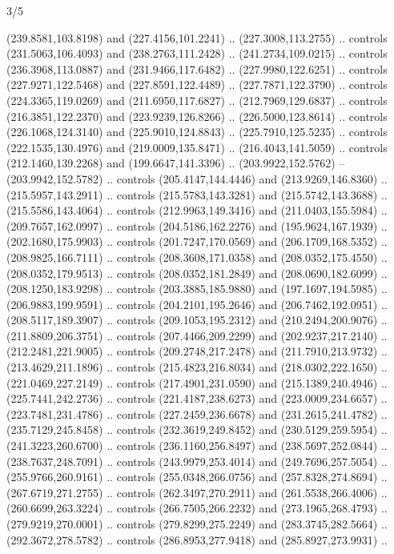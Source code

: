 \begin{flagdescription}{3/5}
\begin{scope}[shift={(0.5\flaglength,0.5\flagwidth)},scale=\flagwidth/510]
\begin{scope}[y=0.80pt, x=0.80pt, yscale=-1.06, xscale=1.06,yshift=-240pt,xshift=-400pt]
\begin{scope}[cm={{0.83333,0.0,0.0,0.83333,(154.64672,48.64761)}}]
  (239.8581,103.8198) and (227.4156,101.2241) .. (227.3008,113.2755) .. controls
  (231.5063,106.4093) and (238.2763,111.2428) .. (241.2734,109.0215) .. controls
  (236.3968,113.0887) and (231.9466,117.6482) .. (227.9980,122.6251) .. controls
  (227.9271,122.5468) and (227.8591,122.4489) .. (227.7871,122.3790) .. controls
  (224.3365,119.0269) and (211.6950,117.6827) .. (212.7969,129.6837) .. controls
  (216.3851,122.2370) and (223.9239,126.8266) .. (226.5000,123.8614) .. controls
  (226.1068,124.3140) and (225.9010,124.8843) .. (225.7910,125.5235) .. controls
  (222.1535,130.4976) and (219.0009,135.8471) .. (216.4043,141.5059) .. controls
  (212.1460,139.2268) and (199.6647,141.3396) .. (203.9922,152.5762) --
  (203.9942,152.5782) .. controls (205.4147,144.4446) and (213.9269,146.8360) ..
  (215.5957,143.2911) .. controls (215.5783,143.3281) and (215.5742,143.3688) ..
  (215.5586,143.4064) .. controls (212.9963,149.3416) and (211.0403,155.5984) ..
  (209.7657,162.0997) .. controls (204.5186,162.2276) and (195.9624,167.1939) ..
  (202.1680,175.9903) .. controls (201.7247,170.0569) and (206.1709,168.5352) ..
  (208.9825,166.7111) .. controls (208.3608,171.0358) and (208.0352,175.4550) ..
  (208.0352,179.9513) .. controls (208.0352,181.2849) and (208.0690,182.6099) ..
  (208.1250,183.9298) .. controls (203.3885,185.9880) and (197.1697,194.5985) ..
  (206.9883,199.9591) .. controls (204.2101,195.2646) and (206.7462,192.0951) ..
  (208.5117,189.3907) .. controls (209.1053,195.2312) and (210.2494,200.9076) ..
  (211.8809,206.3751) .. controls (207.4466,209.2299) and (202.9237,217.2140) ..
  (212.2481,221.9005) .. controls (209.2748,217.2478) and (211.7910,213.9732) ..
  (213.4629,211.1896) .. controls (215.4823,216.8034) and (218.0302,222.1650) ..
  (221.0469,227.2149) .. controls (217.4901,231.0590) and (215.1389,240.4946) ..
  (225.7441,242.2736) .. controls (221.4187,238.6273) and (223.0009,234.6657) ..
  (223.7481,231.4786) .. controls (227.2459,236.6678) and (231.2615,241.4782) ..
  (235.7129,245.8458) .. controls (232.3619,249.8452) and (230.5129,259.5954) ..
  (241.3223,260.6700) .. controls (236.1160,256.8497) and (238.5697,252.0844) ..
  (238.7637,248.7091) .. controls (243.9979,253.4014) and (249.7696,257.5054) ..
  (255.9766,260.9161) .. controls (255.0348,266.0756) and (257.8328,274.8694) ..
  (267.6719,271.2755) .. controls (262.3497,270.2911) and (261.5538,266.4006) ..
  (260.6699,263.3224) .. controls (266.7505,266.2232) and (273.1965,268.4793) ..
  (279.9219,270.0001) .. controls (279.8299,275.2249) and (283.3745,282.5664) ..
  (292.3672,278.5782) .. controls (286.8953,277.9418) and (285.8927,273.9931) ..

\end{scope}
\end{scope}
\end{scope}
\end{flagdescription}
